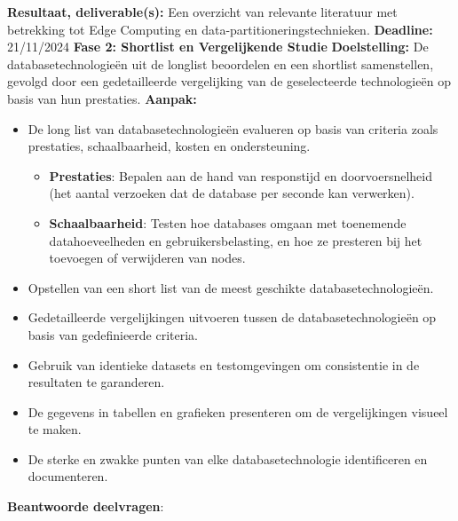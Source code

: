     \textbf{Resultaat, deliverable(s):} Een overzicht van relevante literatuur met betrekking tot Edge Computing en data-partitioneringstechnieken.\newline\newline
    \textbf{Deadline:} 21/11/2024\newline\newline
\textbf{Fase 2: Shortlist en Vergelijkende Studie}\newline\newline
    \textbf{Doelstelling:} De databasetechnologieën uit de longlist beoordelen en een shortlist samenstellen, gevolgd door een gedetailleerde vergelijking van de geselecteerde technologieën op basis van hun prestaties.\newline\newline
    \textbf{Aanpak:}
    \begin{itemize}
        \item De long list van databasetechnologieën evalueren op basis van criteria zoals prestaties, schaalbaarheid, kosten en ondersteuning.
        \begin{itemize}
          \item \textbf{Prestaties}: Bepalen aan de hand van responstijd en doorvoersnelheid (het aantal verzoeken dat de database per seconde kan verwerken).
          \item \textbf{Schaalbaarheid}: Testen hoe databases omgaan met toenemende datahoeveelheden en gebruikersbelasting, en hoe ze presteren bij het toevoegen of verwijderen van nodes.
        \end{itemize}
        \item Opstellen van een short list van de meest geschikte databasetechnologieën.
        \item Gedetailleerde vergelijkingen uitvoeren tussen de databasetechnologieën op basis van gedefinieerde criteria.

        \item Gebruik van identieke datasets en testomgevingen om consistentie in de resultaten te garanderen.
        \item De gegevens in tabellen en grafieken presenteren om de vergelijkingen visueel te maken.
        \item De sterke en zwakke punten van elke databasetechnologie identificeren en documenteren.
    \end{itemize}
    \textbf{Beantwoorde deelvragen}:
